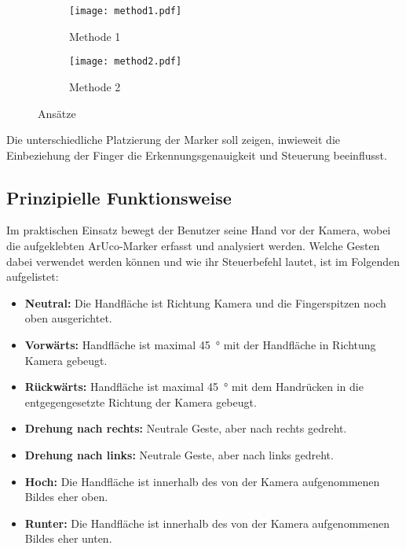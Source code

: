 \begin{figure}[H]
    \centering
    \begin{imgbox}
        \hspace{0.125\textwidth}
        \begin{subfigure}[b]{0.25\textwidth}
            \centering
            \texttt{[image: method1.pdf]}
            \caption{Methode 1}
                \label{pic:m1}
        \end{subfigure}
        \hspace{0.125\textwidth}
        \vrule
        \hspace{0.125\textwidth}
        \begin{subfigure}[b]{0.25\textwidth}
            \centering
            \texttt{[image: method2.pdf]}
            \caption{Methode 2}
                \label{pic:m2}
        \end{subfigure}
        \hspace{0.125\textwidth}
    \end{imgbox}
    \caption{Ansätze}
        \label{fig:methods}
\end{figure}

Die unterschiedliche Platzierung der Marker soll zeigen, inwieweit die Einbeziehung der Finger die Erkennungsgenauigkeit und Steuerung beeinflusst.

\subsection{Prinzipielle Funktionsweise}
Im praktischen Einsatz bewegt der Benutzer seine Hand vor der Kamera, wobei die aufgeklebten ArUco-Marker erfasst und analysiert werden.
Welche Gesten dabei verwendet werden können und wie ihr Steuerbefehl lautet, ist im Folgenden aufgelistet:

\begin{itemize}
    \item \textbf{Neutral:} Die Handfläche ist Richtung Kamera und die Fingerspitzen noch oben ausgerichtet.
    \item \textbf{Vorwärts:} Handfläche ist maximal \SI{45}{\degree} mit der Handfläche in Richtung Kamera gebeugt.
    \item \textbf{Rückwärts:} Handfläche ist maximal \SI{45}{\degree} mit dem Handrücken in die entgegengesetzte Richtung der Kamera gebeugt.
    \item \textbf{Drehung nach rechts:} Neutrale Geste, aber nach rechts gedreht.
    \item \textbf{Drehung nach links:} Neutrale Geste, aber nach links gedreht.
    \item \textbf{Hoch:} Die Handfläche ist innerhalb des von der Kamera aufgenommenen Bildes eher oben.
    \item \textbf{Runter:} Die Handfläche ist innerhalb des von der Kamera aufgenommenen Bildes eher unten.
\end{itemize}

